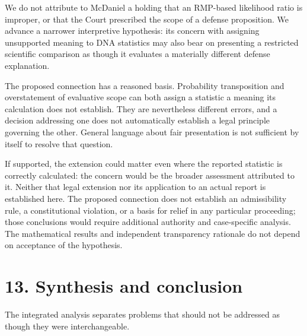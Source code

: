 \documentclass[
]{article}
\begin{document}
We do not attribute to McDaniel a holding that an RMP-based likelihood
ratio is improper, or that the Court prescribed the scope of a defense
proposition. We advance a narrower interpretive hypothesis: its concern
with assigning unsupported meaning to DNA statistics may also bear on
presenting a restricted scientific comparison as though it evaluates a
materially different defense explanation.

The proposed connection has a reasoned basis. Probability transposition
and overstatement of evaluative scope can both assign a statistic a
meaning its calculation does not establish. They are nevertheless
different errors, and a decision addressing one does not automatically
establish a legal principle governing the other. General language about
fair presentation is not sufficient by itself to resolve that question.

If supported, the extension could matter even where the reported
statistic is correctly calculated: the concern would be the broader
assessment attributed to it. Neither that legal extension nor its
application to an actual report is established here. The proposed
connection does not establish an admissibility rule, a constitutional
violation, or a basis for relief in any particular proceeding; those
conclusions would require additional authority and case-specific
analysis. The mathematical results and independent transparency
rationale do not depend on acceptance of the hypothesis.

\section{13. Synthesis and conclusion}\label{synthesis-and-conclusion}

The integrated analysis separates problems that should not be addressed
as though they were interchangeable.
\end{document}
